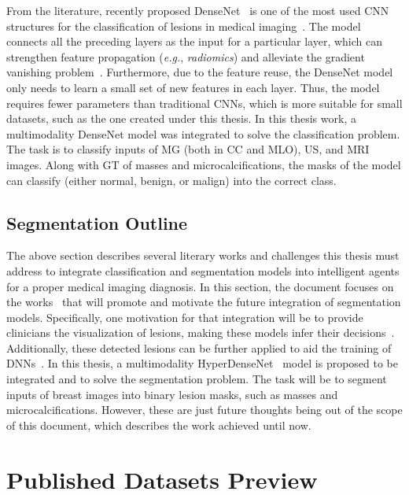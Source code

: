 From the literature, recently proposed \ac{DenseNet}~\cite{Huang_2017_CVPR} is one of the most used \ac{CNN} structures for the classification of lesions in medical imaging~\cite{LIU2019e271}.
The model connects all the preceding layers as the input for a particular layer, which can strengthen feature propagation ({\it e.g.}, {\it radiomics}) and alleviate the gradient vanishing problem~\cite{10.1145/3136755.3143016}.
Furthermore, due to the feature reuse, the \ac{DenseNet} model only needs to learn a small set of new features in each layer.
Thus, the model requires fewer parameters than traditional \acp{CNN}, which is more suitable for small datasets, such as the one created under this thesis.
In this thesis work, a multimodality \ac{DenseNet} model was integrated to solve the classification problem.
The task is to classify inputs of \ac{MG} (both in \ac{CC} and \ac{MLO}), \ac{US}, and \ac{MRI} images.
Along with \ac{GT} of masses and microcalcifications, the masks of the model can classify (either normal, benign, or malign) into the correct class.

\subsection{Segmentation Outline}
\label{sec:app004001002}

The above section describes several literary works and challenges this thesis must address to integrate classification and segmentation models into intelligent agents for a proper medical imaging diagnosis.
In this section, the document focuses on the works~\cite{Dabbous397} that will promote and motivate the future integration of segmentation models.
Specifically, one motivation for that integration will be to provide clinicians the visualization of lesions, making these models infer their decisions~\cite{CHOUGRAD201819, doi:10.1148/radiol.2018181371}.
Additionally, these detected lesions can be further applied to aid the training of \acp{DNN}~\cite{8032490, 8861376}.
In this thesis, a multimodality HyperDenseNet~\cite{8515234} model is proposed to be integrated and to solve the segmentation problem.
The task will be to segment inputs of breast images into binary lesion masks, such as masses and microcalcifications.
However, these are just future thoughts being out of the scope of this document, which describes the work achieved until now.

\section{Published Datasets Preview}
\label{sec:app004002}

